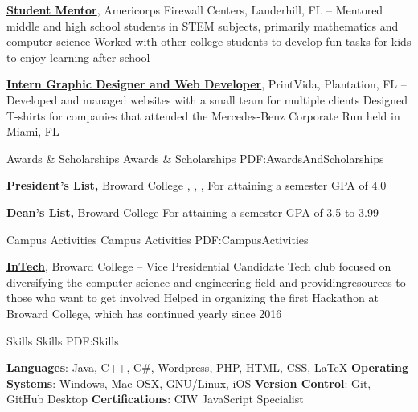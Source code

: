 \documentclass[a4paper,MMMyyyy,nonstopmode]{resume}
\begin{document}
\begin{Body}
\BigGap
\Entry
\href{http://www.example.com/my-company}
{\textbf{Student Mentor}},
Americorps Firewall Centers,
Lauderhill, FL
\hfill
{} --
\Gap
\BulletItem
Mentored middle and high school students in STEM subjects, primarily mathematics and computer science
\BulletItem
Worked with other college students to develop fun tasks for kids to enjoy learning after school

\BigGap
\Entry
\href{http://www.example.com/my-company}
{\textbf{Intern Graphic Designer and Web Developer}},
PrintVida,
Plantation, FL
\hfill
{} --
\Gap
\BulletItem
Developed and managed websites with a small team for multiple clients
\BulletItem
Designed T-shirts for companies that attended the Mercedes-Benz Corporate Run held in Miami, FL


\Section
{Awards \&\newline
Scholarships}
{Awards \& Scholarships}
{PDF:AwardsAndScholarships}

\Entry
\textbf{President's List,}
Broward College
\hfill
{}, 
,
, 
\Gap
\BulletItem
For attaining a semester GPA of 4.0

\BigGap

\Entry
\textbf{Dean's List,}
Broward College
\hfill
{}
\Gap
\BulletItem
For attaining a semester GPA of 3.5 to 3.99


\Section
{Campus Activities}
{Campus Activities}
{PDF:CampusActivities}

\Entry
\href{https://cse.broward.edu/intech/index.php/about-us/}
{\textbf{InTech}},
Broward College
\hfill
{} --
\Gap
\BulletItem
Vice Presidential Candidate
\BulletItem
Tech club focused on diversifying the computer science and engineering field and providing\newline resources to those who want to get involved
\BulletItem
Helped in organizing the first Hackathon at Broward College, which has continued yearly since 2016


\Section
{Skills}
{Skills}
{PDF:Skills}

\Entry
\textbf{Languages}:
Java, C++,  C\#, Wordpress, PHP, HTML, CSS, {\LaTeX}
\newline
\textbf{Operating Systems}:
Windows, Mac OSX, GNU/Linux, iOS
\newline
\textbf{Version Control}:
Git, GitHub Desktop
\newline
\textbf{Certifications}:
CIW JavaScript Specialist


\end{Body}
\end{document}
